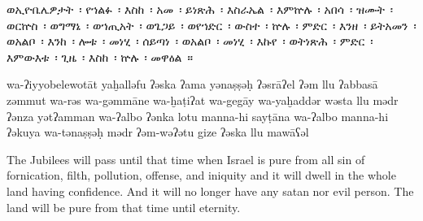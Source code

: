 
\begin{ethiopictext}
    ወኢዮቤሌዎታት~፡ የኀልፉ~፡ እስከ~፡ አመ~፡ ይነጽሕ~፡ እስራኤል~፡
    እምኵሉ~፡ አበሳ~፡ ዝሙት~፡ ወርኵስ~፡ ወግማኔ~፡ ወኀጢአት~፡ ወጌጋይ~፡ 
    ወየኀድር~፡ ውስተ~፡ ኵሉ~፡ ምድር~፡ እንዘ~፡ ይትአመን~፡ ወአልቦ~፡
    እንከ~፡ ሎቱ~፡ መነሂ~፡ ሰይጣነ~፡ ወአልቦ~፡ መነሂ~፡ እኩየ~፡ ወትነጽሕ~፡ 
    ምድር~፡ እምውእቱ~፡ ጊዜ~፡ እስከ~፡ ኵሉ~፡ መዋዕል~።
\end{ethiopictext}

\begin{transliteration}
    wa-ʔiyyobelewotāt yaḫalləfu ʔəska ʔama yənaṣṣəḥ ʔəsrāʔel
    ʔəm llu ʔabbasā zəmmut wa-rə\kw{}s wa-gəmmāne wa-ḫaṭiʔat wa-gegāy
    wa-yaḫaddər wəsta llu mədr ʔənza yətʔamman wa-ʔalbo
    ʔənka lotu manna-hi sayṭāna wa-ʔalbo manna-hi ʔəkuya wa-tənaṣṣəḥ
    mədr ʔəm-wəʔətu gize ʔəska llu mawāʕəl
\end{transliteration}

\begin{translation}
    The Jubilees will pass until that time when Israel is pure
    from all sin of fornication, filth, pollution, offense, and iniquity
    and it will dwell in the whole land having confidence. And it will no longer have
    any satan nor evil person. The land will be pure from that time until eternity.
\end{translation}